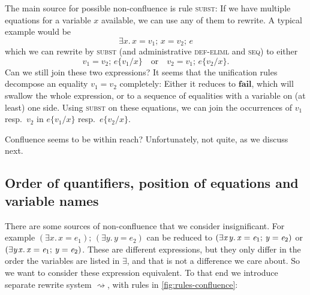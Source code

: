 \documentclass[acmsmall,review,dvipsnames]{acmart}
\newcommand{\Varid}[1]{\mathit{#1}}
\newcommand{\rulename}[1]{\textsc{\small #1}}
\newcommand{\subst}[3]{#1\{#3/#2\}}
\newcommand{\movestoX}{\rightsquigarrow}
\begin{document}
The main source for possible non-confluence is rule \rulename{subst}: If we have multiple equations for a variable $x$ available, we can use any of them to rewrite. A typical example would be
\[ \ensuremath{\exists\Varid{x}.\,\Varid{x}\mathrel{=}\Varid{v}_{\mathrm{1}};\,\Varid{x}\mathrel{=}\Varid{v}_{\mathrm{2}};\,\Varid{e}} \]
which we can rewrite by \rulename{subst} (and administrative \rulename{def-eliml} and \rulename{seq}) to either
\[ \ensuremath{\Varid{v}_{\mathrm{1}}\mathrel{=}\Varid{v}_{\mathrm{2}};\,\subst{\Varid{e}}{\Varid{x}}{\Varid{v}_{\mathrm{1}}}} \quad \text{or} \quad \ensuremath{\Varid{v}_{\mathrm{2}}\mathrel{=}\Varid{v}_{\mathrm{1}};\,\subst{\Varid{e}}{\Varid{x}}{\Varid{v}_{\mathrm{2}}}}. \]
Can we still join these two expressions? It seems that the unification rules decompose an equality \ensuremath{\Varid{v}_{\mathrm{1}}\mathrel{=}\Varid{v}_{\mathrm{2}}} completely: Either it reduces to \ensuremath{\textbf{fail}}, which will swallow the whole expression, or to a sequence of equalities with a variable on (at least) one side. Using \rulename{subst} on these equations, we can join the occurrences of $v_1$ resp.\ $v_2$ in \ensuremath{\subst{\Varid{e}}{\Varid{x}}{\Varid{v}_{\mathrm{1}}}} resp.\ \ensuremath{\subst{\Varid{e}}{\Varid{x}}{\Varid{v}_{\mathrm{2}}}}.

Confluence seems to be within reach? Unfortunately, not quite, as we discuss next.

\subsection{Order of quantifiers, position of equations and variable names}
\label{sec:confluence-extra}


There are some sources of non-confluence that we consider insignificant. For example
\ensuremath{(\exists\Varid{x}.\,\Varid{x}\mathrel{=}\Varid{e}_{\mathrm{1}});\,(\exists\Varid{y}.\,\Varid{y}\mathrel{=}\Varid{e}_{\mathrm{2}})}
can be reduced to
\ensuremath{(\exists\Varid{x}\hspace{0.3mm}\Varid{y}.\,\Varid{x}\mathrel{=}\Varid{e}_{\mathrm{1}};\,\Varid{y}\mathrel{=}\Varid{e}_{\mathrm{2}})}
or
\ensuremath{(\exists\Varid{y}\hspace{0.3mm}\Varid{x}.\,\Varid{x}\mathrel{=}\Varid{e}_{\mathrm{1}};\,\Varid{y}\mathrel{=}\Varid{e}_{\mathrm{2}})}. These are different expressions, but they only differ in the order the variables are listed in \ensuremath{\exists}, and that is not a difference we care about. So we want to consider these expression equivalent. To that end we introduce separate rewrite system $\movestoX$, with rules in \cref{fig:rules-confluence}:
\end{document}
